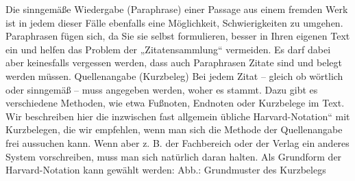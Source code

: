 \documentclass[]{book}
\theoremstyle{definition}
\theoremstyle{definition}
\theoremstyle{definition}
\theoremstyle{remark}
\begin{document}
Die sinngemäße Wiedergabe (Paraphrase) einer Passage aus einem fremden
Werk ist in jedem dieser Fälle ebenfalls eine Möglichkeit,
Schwierigkeiten zu umgehen. Paraphrasen fügen sich, da Sie sie selbst
formulieren, besser in Ihren eigenen Text ein und helfen das Problem der
„Zitatensammlung`` vermeiden. Es darf dabei aber keinesfalls vergessen
werden, dass auch Paraphrasen Zitate sind und belegt werden müssen.
Quellenangabe (Kurzbeleg) Bei jedem Zitat -- gleich ob wörtlich oder
sinngemäß -- muss angegeben werden, woher es stammt. Dazu gibt es
verschiedene Methoden, wie etwa Fußnoten, Endnoten oder Kurzbelege im
Text. Wir beschreiben hier die inzwischen fast allgemein übliche
Harvard-Notation`` mit Kurzbelegen, die wir empfehlen, wenn man sich die
Methode der Quellenangabe frei aussuchen kann. Wenn aber z. B. der
Fachbereich oder der Verlag ein anderes System vorschreiben, muss man
sich natürlich daran halten. Als Grundform der Harvard-Notation kann
gewählt werden: Abb.: Grundmuster des Kurzbelegs
\end{document}

